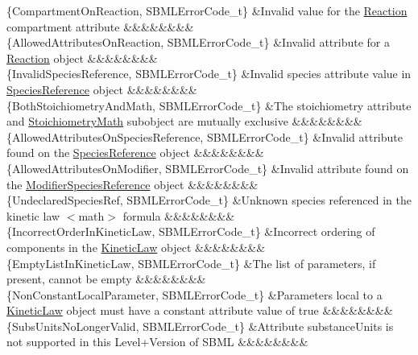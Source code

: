 \begin{DoxyParagraph}{}
\begin{longtabu}
\{Compartment\+On\+Reaction, S\+B\+M\+L\+Error\+Code\+\_\+t\} &Invalid value for the \hyperlink{class_reaction}{Reaction} \textquotesingle{}compartment\textquotesingle{} attribute &&&&&&&&\\
\{Allowed\+Attributes\+On\+Reaction, S\+B\+M\+L\+Error\+Code\+\_\+t\} &Invalid attribute for a \hyperlink{class_reaction}{Reaction} object &&&&&&&&\\
\{Invalid\+Species\+Reference, S\+B\+M\+L\+Error\+Code\+\_\+t\} &Invalid \textquotesingle{}species\textquotesingle{} attribute value in \hyperlink{class_species_reference}{Species\+Reference} object &&&&&&&&\\
\{Both\+Stoichiometry\+And\+Math, S\+B\+M\+L\+Error\+Code\+\_\+t\} &The \textquotesingle{}stoichiometry\textquotesingle{} attribute and \hyperlink{class_stoichiometry_math}{Stoichiometry\+Math} subobject are mutually exclusive &&&&&&&&\\
\{Allowed\+Attributes\+On\+Species\+Reference, S\+B\+M\+L\+Error\+Code\+\_\+t\} &Invalid attribute found on the \hyperlink{class_species_reference}{Species\+Reference} object &&&&&&&&\\
\{Allowed\+Attributes\+On\+Modifier, S\+B\+M\+L\+Error\+Code\+\_\+t\} &Invalid attribute found on the \hyperlink{class_modifier_species_reference}{Modifier\+Species\+Reference} object &&&&&&&&\\
\{Undeclared\+Species\+Ref, S\+B\+M\+L\+Error\+Code\+\_\+t\} &Unknown species referenced in the kinetic law {\ttfamily $<$math$>$} formula &&&&&&&&\\
\{Incorrect\+Order\+In\+Kinetic\+Law, S\+B\+M\+L\+Error\+Code\+\_\+t\} &Incorrect ordering of components in the \hyperlink{class_kinetic_law}{Kinetic\+Law} object &&&&&&&&\\
\{Empty\+List\+In\+Kinetic\+Law, S\+B\+M\+L\+Error\+Code\+\_\+t\} &The list of parameters, if present, cannot be empty &&&&&&&&\\
\{Non\+Constant\+Local\+Parameter, S\+B\+M\+L\+Error\+Code\+\_\+t\} &Parameters local to a \hyperlink{class_kinetic_law}{Kinetic\+Law} object must have a \textquotesingle{}constant\textquotesingle{} attribute value of \textquotesingle{}true\textquotesingle{} &&&&&&&&\\
\{Subs\+Units\+No\+Longer\+Valid, S\+B\+M\+L\+Error\+Code\+\_\+t\} &Attribute \textquotesingle{}substance\+Units\textquotesingle{} is not supported in this Level+\+Version of S\+B\+ML &&&&&&&&\\

\end{longtabu}
\end{DoxyParagraph}
